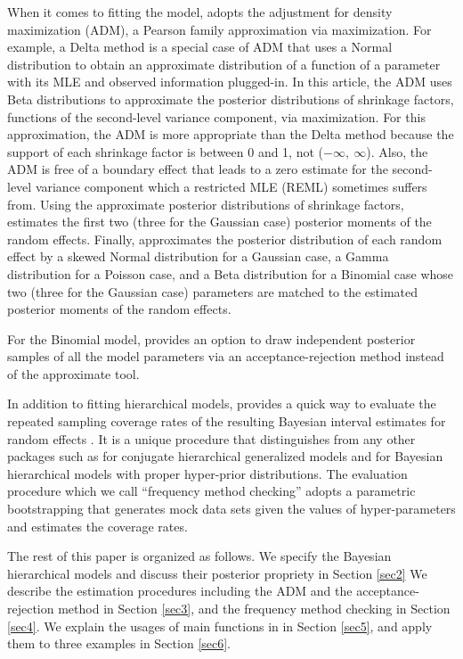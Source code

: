 \documentclass[article]{jss}
\begin{document}
When it comes to fitting the model,  adopts the adjustment for density maximization \citep{carl1988, morris1997, tang2011} (ADM), a Pearson family approximation via maximization. For example, a Delta method is a special case of ADM that uses a Normal distribution to obtain an approximate distribution of a function of a parameter with its MLE and observed information plugged-in. In this article, the ADM uses Beta distributions to approximate the posterior distributions of shrinkage factors, functions of the second-level variance component, via maximization. For this approximation, the ADM  is more appropriate than the Delta method because the support of each shrinkage factor is between 0 and 1, not ($-\infty,~\infty$). Also, the ADM is free of a boundary effect that leads to a zero estimate for the second-level variance component  which a restricted MLE \citep{patterson1971recovery} (REML) sometimes suffers from. Using the approximate posterior distributions of shrinkage factors,  estimates the first two (three for the Gaussian case) posterior moments of the random effects. Finally,  approximates the posterior distribution of each random effect by a skewed Normal distribution for a Gaussian case, a Gamma distribution for a Poisson case, and a Beta distribution for a Binomial case whose two (three for the Gaussian case) parameters are matched to the estimated posterior moments of the random effects. 

For the Binomial  model,  provides an option to draw independent posterior samples of all the model parameters via an acceptance-rejection method instead of the approximate tool.


In addition to fitting hierarchical models,  provides a quick way to evaluate the repeated sampling coverage rates of the resulting Bayesian interval estimates for random effects \citep{morris1997, daniels1999prior, tang2002fitting, tang2011, morris2012}. It is a unique procedure that distinguishes   from any other  packages  such as  \citep{hglm2010, ronnegaard2011hglm} for conjugate hierarchical generalized models and  \citep{gelman2014arm} for Bayesian hierarchical models with proper hyper-prior distributions. The evaluation procedure which we call ``frequency method checking'' adopts a parametric bootstrapping that generates mock data sets given the values of hyper-parameters and estimates the coverage rates.

The rest of this paper is organized as follows. We specify the Bayesian hierarchical models and discuss their posterior propriety in Section \ref{sec2} We describe the estimation procedures including the ADM and the acceptance-rejection method in Section  \ref{sec3}, and the frequency method checking in Section \ref{sec4}.  We explain the usages of main functions in  in Section \ref{sec5}, and apply them to three examples in Section \ref{sec6}.
\end{document}
